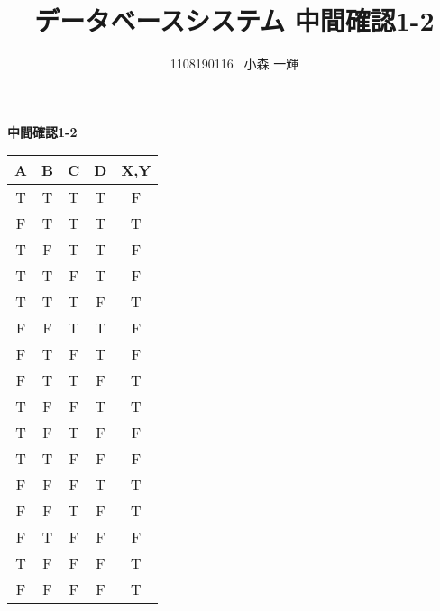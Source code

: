 \documentclass[dvipdfmx,10pt, a4j]{jarticle}
\title{データベースシステム 中間確認1-2}
\author{1108190116 \, 小森 一輝}
\theoremstyle{definition}
\begin{document}
    \maketitle

    \setcounter{section}{2}
    \noindent
    \textbf{中間確認1-2}\\

    \begin{tabular}{|c|c|c|c|c|}
        \hline
        A & B & C & D & X,Y\\
        \hline
        \hline
        T & T & T & T & F\\
        \hline
        F & T & T & T & T\\
        \hline
        T & F & T & T & F\\
        \hline
        T & T & F & T & F\\
        \hline
        T & T & T & F & T\\
        \hline
        F & F & T & T & F\\
        \hline
        F & T & F & T & F\\
        \hline
        F & T & T & F & T\\
        \hline
        T & F & F & T & T\\
        \hline
        T & F & T & F & F\\
        \hline
        T & T & F & F & F\\
        \hline
        F & F & F & T & T\\
        \hline
        F & F & T & F & T\\
        \hline
        F & T & F & F & F\\
        \hline
        T & F & F & F & T\\
        \hline
        F & F & F & F & T\\
        \hline
    \end{tabular}\\
\end{document}
